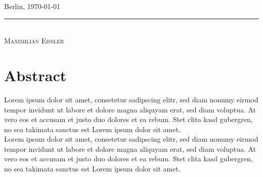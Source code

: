 \documentclass[
	11pt,								%
	DIV10,								%
	a4paper,         					%
	oneside,							%
	headheight=20pt,					%
	footheight=20pt,					%
    parskip=full,						%
    listof=totoc,						%
	bibliography=totoc,					%
	index=totoc,						%
]{scrartcl}
\newcommand{\autor}{Maximilian Eißler} 		%
\newcommand{\engdate}{\selectlanguage{english}\today}
\begin{document}
	Berlin, \engdate
	
	\bigskip
	\bigskip
		\begin{center}	
			\begin{minipage}[t]{0.3\textwidth}
				\rule[-0.2cm]{4.5cm}{0.5pt} \\
				\textsc{\autor}
			\end{minipage}
		\end{center}
	
	\newpage


	\section*{Abstract}
	
	Lorem ipsum dolor sit amet, consetetur sadipscing elitr, sed diam nonumy eirmod tempor invidunt
	ut labore et dolore magna aliquyam erat, sed diam voluptua. At vero eos et accusam et justo
	duo dolores et ea rebum. Stet clita kasd gubergren, no sea takimata sanctus est Lorem ipsum
	dolor sit amet. \\
	Lorem ipsum dolor sit amet, consetetur sadipscing elitr, sed diam nonumy eirmod tempor invidunt
	ut labore et dolore magna aliquyam erat, sed diam voluptua. At vero eos et accusam et justo
	duo dolores et ea rebum. Stet clita kasd gubergren, no sea takimata sanctus est Lorem ipsum
	dolor sit amet.
	
	\newpage	

	
	\setcounter{tocdepth}{4} 					%
    \setcounter{secnumdepth}{4}					%
	
    \begingroup									%
	\parskip=0pt	
    \endgroup
    \newpage
    \begin{onehalfspace}
    \tableofcontents 							%
	\end{onehalfspace}
	\newpage
		
	\renewcommand{\cftfigpresnum}{Figure }
	\settowidth{\cftfignumwidth}{Figure 5\quad}  
	\listoffigures								%
		
\end{document}
